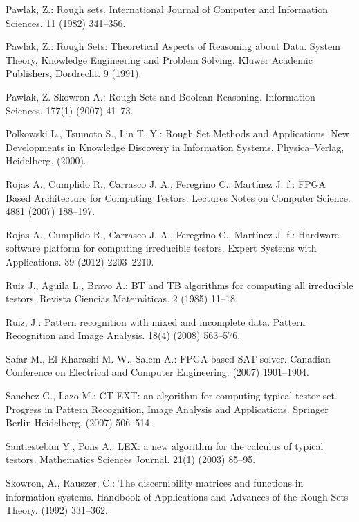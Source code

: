 \documentclass[11pt]{article}   %
\begin{document}
\begin{thebibliography}{}
	Pawlak, Z.: 
	Rough sets.
	International Journal of Computer and Information Sciences. 11 (1982) 341--356.

	Pawlak, Z.: 
	Rough Sets: Theoretical Aspects of Reasoning about Data.
	System Theory, Knowledge Engineering and Problem Solving. 
	Kluwer Academic Publishers, Dordrecht. 9 (1991).
	
	Pawlak, Z. Skowron A.: 
	Rough Sets and Boolean Reasoning.
	Information Sciences. 177(1) (2007) 41--73.
	
	Polkowski L., Tsumoto S., Lin T. Y.: 
	Rough Set Methods and Applications. 
	New Developments in Knowledge Discovery in Information Systems.
	Physica–Verlag, Heidelberg. (2000).

	Rojas A., Cumplido R., Carrasco J. A., Feregrino C., Mart\'inez J. f.:
	FPGA Based Architecture for Computing Testors. 
	Lectures Notes on Computer Science. 4881 (2007) 188--197.

	Rojas A., Cumplido R., Carrasco J. A., Feregrino C., Mart\'inez J. f.:
	Hardware-software platform for computing irreducible testors. 
	Expert Systems with Applications. 39 (2012) 2203--2210.

	Ruiz J., Aguila L., Bravo A.:
	BT and TB algorithms for computing all irreducible testors. 
	Revista Ciencias Matem\'aticas. 2 (1985) 11--18.
	
	Ruiz, J.:
 	Pattern recognition with mixed and incomplete data. 
 	Pattern Recognition and Image Analysis. 18(4) (2008) 563--576.
 	
	Safar M., El-Kharashi M. W., Salem A.:
	FPGA-based SAT solver. 
	Canadian Conference on Electrical and Computer Engineering. (2007) 1901--1904. 
	
 	Sanchez G., Lazo M.:
 	CT-EXT: an algorithm for computing typical testor set.
 	Progress in Pattern Recognition, Image Analysis and Applications. 
 	Springer Berlin Heidelberg. (2007) 506--514.
 
	Santiesteban Y., Pons A.:
	LEX: a new algorithm for the calculus of typical testors.
	Mathematics Sciences Journal. 21(1) (2003) 85--95.
	
	Skowron, A., Rauszer, C.:
	The discernibility matrices and functions in information systems. 
	Handbook of Applications and Advances of the Rough Sets Theory. (1992) 331--362.


\end{thebibliography}
\end{document}
